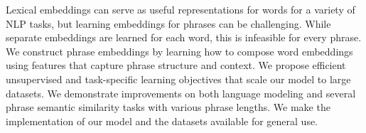 Lexical embeddings can serve as useful representations for words for a variety of NLP tasks, but learning embeddings for phrases can be challenging. While separate embeddings are learned for each word, this is infeasible for every phrase. We construct phrase embeddings by learning how to compose word embeddings using features that capture phrase structure and context. We propose efficient unsupervised and task-specific learning objectives that scale our model to large datasets. We demonstrate improvements on both language modeling and several phrase semantic similarity tasks with various phrase lengths. We make the implementation of our model and the datasets available for general use.